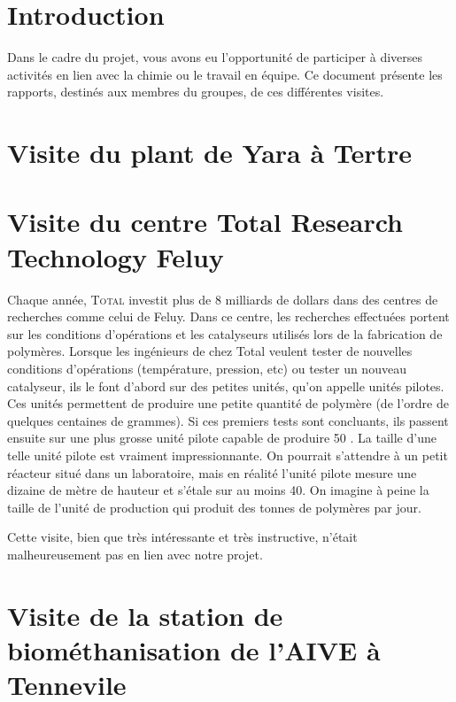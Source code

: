 

\section{Introduction}
Dans le cadre du projet, vous avons eu l'opportunité de
participer à diverses activités en lien avec la chimie ou
le travail en équipe. Ce document présente les rapports,
destinés aux membres du groupes, de ces différentes visites.

\section{Visite du plant de Yara à Tertre}

\section{Visite du centre Total Research Technology Feluy}
Chaque année, \textsc{Total} investit plus de 8 milliards de
dollars dans des centres de recherches comme celui de Feluy.
Dans ce centre, les recherches effectuées portent sur les
conditions d'opérations et les catalyseurs utilisés lors de
la fabrication de polymères. Lorsque les ingénieurs de chez
Total veulent tester de nouvelles conditions d'opérations
(température, pression, etc) ou tester un nouveau catalyseur,
ils le font d'abord sur des petites unités, qu'on appelle unités
pilotes. Ces unités permettent de produire une petite quantité
de polymère (de l'ordre de quelques centaines de grammes). Si
ces premiers tests sont concluants, ils passent ensuite sur une
plus grosse unité pilote capable de produire \unit{50}{\kilo\gram
\per\dday}. La taille d'une telle unité pilote est vraiment
impressionnante. On pourrait s'attendre à un petit réacteur situé
dans un laboratoire, mais en réalité l'unité pilote mesure une dizaine
de mètre de hauteur et s'étale sur au moins \unit{40}{\meter\squared}.
On imagine à peine la taille de l'unité de production qui produit
des tonnes de polymères par jour.

Cette visite, bien que très intéressante et très instructive, n'était
malheureusement pas en lien avec notre projet.

\section{Visite de la station de biométhanisation de l'AIVE à Tennevile}


